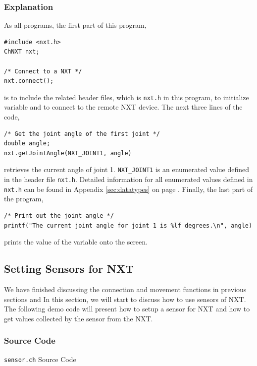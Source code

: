 \documentclass[11pt]{article}
\begin{document}
\subsubsection*{Explanation}
As all programs, the first part of this program,
\begin{verbatim}
#include <nxt.h>
ChNXT nxt;

/* Connect to a NXT */
nxt.connect();
\end{verbatim}
\noindent
is to include the related header files, which is \texttt{nxt.h} in this program, to initialize variable and 
to connect to the remote NXT device. The next three lines of the code,
\begin{verbatim}
/* Get the joint angle of the first joint */
double angle;
nxt.getJointAngle(NXT_JOINT1, angle)
\end{verbatim}
\noindent
retrieves the current angle of joint 1. \texttt{NXT\_JOINT1} is an enumerated value defined in the header
file \texttt{nxt.h}. Detailed information for all enumerated values defined in \texttt{nxt.h} can be found
in Appendix \ref{sec:datatypes} on page \pageref{sec:datatypes}. Finally, the last part of the program,
\begin{verbatim}
/* Print out the joint angle */
printf("The current joint angle for joint 1 is %lf degrees.\n", angle)
\end{verbatim}
\noindent
prints the value of the variable onto the screen.\\

\subsection{\label{setSensor_demo}Setting Sensors for NXT}
We have finished discussing the connection and movement functions in previous sections and In this section,
we will start to discuss how to use sensors of NXT. The following demo code will present how to setup a sensor
for NXT and how to get values collected by the sensor from the NXT.
\subsubsection*{Source Code}
\begin{Program}[H]
    {\small}
    \caption{\texttt{sensor.ch} Source Code\label{prog_sensor.ch}}
\end{Program}
\end{document}
